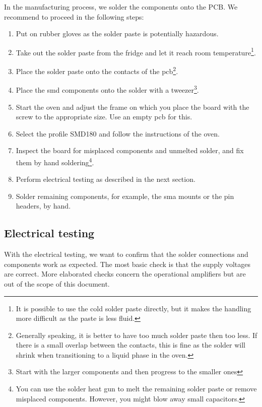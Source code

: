 In the manufacturing process, we solder the components onto the PCB.
We recommend to proceed in the following steps:

\begin{enumerate}
    \item Put on rubber gloves as the solder paste is potentially hazardous.
    \item  Take out the solder paste from the fridge and let it reach room temperature\footnote{It is possible to use the cold solder paste directly, but it makes the handling more difficult as the paste is less fluid.}.
    \item Place the solder paste onto the contacts of the \gls{pcb}\footnote{Generally speaking, it is better to have too much solder paste then too less. If there is a small overlap between the contacts, this is fine as the solder will shrink when transitioning to a liquid phase in the oven.}.
    \item Place the \gls{smd} components onto the solder with a tweezer\footnote{Start with the larger components and then progress to the smaller ones}.
    \item Start the oven and adjust the frame on which you place the board with the screw to the appropriate size. Use an empty \gls{pcb} for this.
    \item Select the profile SMD180 and follow the instructions of the oven.
    \item Inspect the board for misplaced components and unmelted solder, and fix them by hand soldering\footnote{You can use the solder heat gun to melt the remaining solder paste or remove misplaced components. 
However, you might blow away small capacitors.}.
	\item Perform electrical testing as described in the next section.
	\item Solder remaining components, for example, the \gls{sma} mounts or the pin headers, by hand.
\end{enumerate}

\subsection{Electrical testing}

With the electrical testing, we want to confirm that the solder connections and components work as expected.
The most basic check is that the supply voltages are correct.
More elaborated checks concern the operational amplifiers but are out of the scope of this document.

